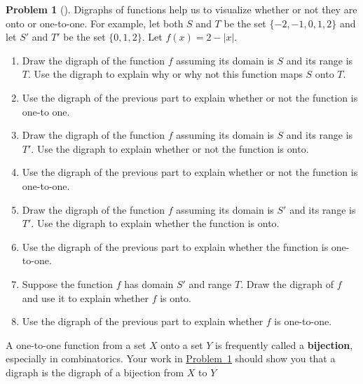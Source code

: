\documentclass[10pt,]{book}
\newcommand{\terminology}[1]{\textbf{#1}}
\theoremstyle{plain}
\theoremstyle{definition}
\newtheorem{activity}[project]{Problem}
\theoremstyle{definition}
\numberwithin{equation}{chapter}
\begin{document}
\begin{activity}[]\marginsymbol[-1em]{} \label{functiondigraphs-prob}
\hypertarget{p-1885}{}%
Digraphs of functions help us to visualize whether or not they are onto or one-to-one. For example, let both \(S\) and \(T\) be the set \(\{-2, -1, 0 ,1, 2\}\) and let \(S'\) and \(T'\) be the set \(\{0,1,2\}\).  Let \(f(x) = 2-|x|\).%
\begin{enumerate}[font=\bfseries,label=(\alph*),ref=\alph*]
\item\label{task-246} \marginsymbol[-2.5em]{} \hypertarget{p-1886}{}%
Draw the digraph of the function \(f\) assuming its domain is \(S\) and its range is \(T\).  Use the digraph to explain why or why not this function maps \(S\) onto \(T\).%
\item\label{task-247} \marginsymbol[-2.5em]{} \hypertarget{p-1888}{}%
Use the digraph of the previous part to explain whether or not the function is one-to one.%
\item\label{task-248} \marginsymbol[-2.5em]{} \hypertarget{p-1890}{}%
Draw the digraph of the function \(f\) assuming its domain is \(S\) and its range is \(T'\). Use the digraph to explain whether or not the function is onto.%
\item\label{task-249} \marginsymbol[-2.5em]{} \hypertarget{p-1892}{}%
Use the digraph of the previous part to explain whether or not the function is one-to-one.%
\item\label{task-250} \marginsymbol[-2.5em]{} \hypertarget{p-1894}{}%
Draw the digraph of the function \(f\) assuming its domain is \(S'\) and its range is \(T'\). Use the digraph to explain whether the function is onto.%
\item\label{task-251} \marginsymbol[-2.5em]{} \hypertarget{p-1896}{}%
Use the digraph of the previous part to explain whether the function is one-to-one.%
\item\label{task-252} \marginsymbol[-2.5em]{} \hypertarget{p-1898}{}%
Suppose the function \(f\) has domain \(S'\) and range \(T\).  Draw the digraph of \(f\) and use it to explain whether \(f\) is onto.%
\item\label{task-253} \marginsymbol[-2.5em]{} \hypertarget{p-1900}{}%
Use the digraph of the previous part to explain whether \(f\) is one-to-one.%
\end{enumerate}
\end{activity}
\hypertarget{p-1902}{}%
A one-to-one function from a set \(X\) onto a set \(Y\) is frequently called a \terminology{bijection}, especially in combinatorics.  Your work in \hyperref[functiondigraphs-prob]{Problem~\ref{functiondigraphs-prob}} should show you that a digraph is the digraph of a bijection from \(X\) to \(Y\) \leavevmode%
\end{document}
